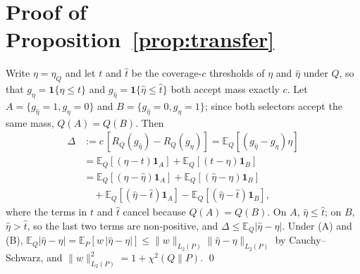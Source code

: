 \documentclass{esannV2}
\begin{document}
\section{Proof of Proposition~\ref{prop:transfer}}\label{app:proof}
Write $\eta=\eta_Q$ and let $t$ and $\hat t$ be the coverage-$c$ thresholds of $\eta$ and $\hat\eta$ under $Q$, so that $g_\eta=\mathbf 1\{\eta\le t\}$ and $g_{\hat\eta}=\mathbf 1\{\hat\eta\le\hat t\}$ both accept mass exactly $c$. Let $A=\{g_{\hat\eta}=1,g_\eta=0\}$ and $B=\{g_{\hat\eta}=0,g_\eta=1\}$; since both selectors accept the same mass, $Q(A)=Q(B)$. Then
\begin{align*}
\Delta &:= c\,[R_Q(g_{\hat\eta})-R_Q(g_\eta)] = \mathbb E_Q[(g_{\hat\eta}-g_\eta)\eta]\\
&= \mathbb E_Q[(\eta-t)\mathbf 1_A]+\mathbb E_Q[(t-\eta)\mathbf 1_B]\\
&= \mathbb E_Q[(\eta-\hat\eta)\mathbf 1_A]+\mathbb E_Q[(\hat\eta-\eta)\mathbf 1_B]\\
&\quad+\mathbb E_Q[(\hat\eta-\hat t)\mathbf 1_A]-\mathbb E_Q[(\hat\eta-\hat t)\mathbf 1_B],
\end{align*}
where the terms in $t$ and $\hat t$ cancel because $Q(A)=Q(B)$. On $A$, $\hat\eta\le\hat t$; on $B$, $\hat\eta>\hat t$, so the last two terms are non-positive, and $\Delta\le\mathbb E_Q|\hat\eta-\eta|$. Under (A) and (B), $\mathbb E_Q|\hat\eta-\eta|=\mathbb E_P[w\,|\hat\eta-\eta|]\le\|w\|_{L_2(P)}\|\hat\eta-\eta\|_{L_2(P)}$ by Cauchy--Schwarz, and $\|w\|^2_{L_2(P)}=1+\chi^2(Q\|P)$. \qed


\FloatBarrier
\end{document}
